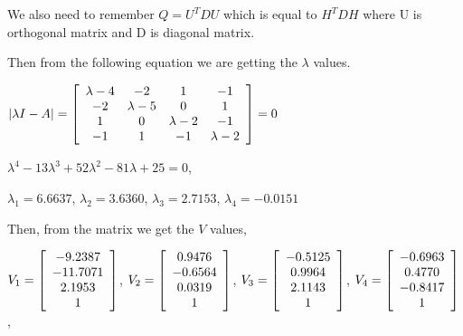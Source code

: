 \documentclass[]{article}
\begin{document}
\vspace{0.5em}

We also need to remember $Q = U^TDU$ which is equal to $H^TDH$ where U is orthogonal matrix and D is diagonal matrix. 

Then from the following equation we are getting the $\lambda$ values. 

\vspace{0.5em}

\centerline {
	$|\lambda I - A| = \left[ {\begin{array}{*{20}c}
		\lambda - 4 & -2 & 1 & -1 \\
		-2 & \lambda - 5 & 0 & 1 \\ 
		1 & 0 & \lambda - 2 &  -1 \\
		-1 & 1 & -1 & \lambda - 2  
		\end{array} } \right] = 0$
}

\vspace{1.0em}

\centerline {
	$\lambda ^4 - 13 \lambda ^3 + 52 \lambda ^2 - 81 \lambda + 25 = 0$, 
}

\vspace{1.0em}

\centerline {
	$\lambda _1 = 6.6637$, $\lambda _2 = 3.6360$, $\lambda _3 = 2.7153$, $\lambda _4 = -0.0151$
}

\vspace{1.0em}

Then, from the matrix we get the $V$ values, 

\vspace{0.5em}

\centerline {
	$V_1 = \left[ {\begin{array}{*{20}c}
		-9.2387 \\
		-11.7071 \\ 
		2.1953 \\
		1  
		\end{array} } \right]$, 
	$V_2 = \left[ {\begin{array}{*{20}c}
		0.9476 \\
		-0.6564 \\ 
		0.0319 \\
		1  
		\end{array} } \right]$, 
	$V_3 = \left[ {\begin{array}{*{20}c}
		-0.5125 \\
		0.9964 \\ 
		2.1143 \\
		1  
		\end{array} } \right]$,
	$V_4 = \left[ {\begin{array}{*{20}c}
		-0.6963 \\
		0.4770 \\ 
		-0.8417 \\
		1  
		\end{array} } \right]$,  
}
\end{document}
